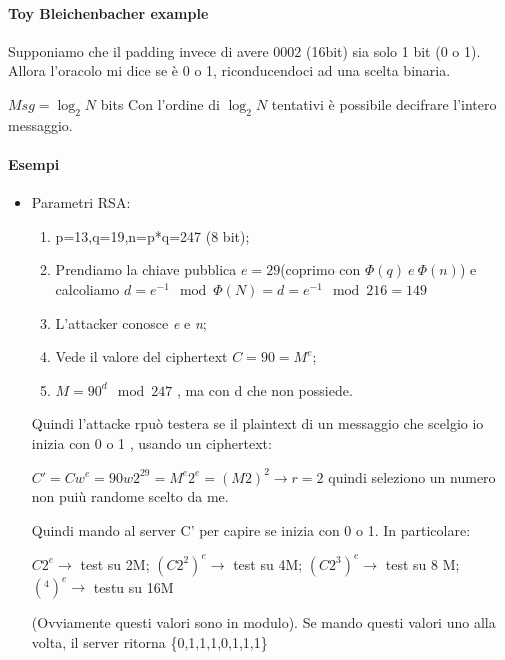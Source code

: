 \documentclass{book}
\theoremstyle{remark}
\begin{document}
\paragraph{Toy Bleichenbacher example}
Supponiamo che il padding invece di avere 0002 (16bit) sia solo 1 bit (0 o 1)\@. Allora l'oracolo mi dice se è 0 o 1, riconducendoci ad una scelta binaria\@.\newline
\begin{center}
	\(Msg=\log_{2}{N}\) bits\newline
	Con l'ordine di \(\log_{2}{N}\) tentativi è possibile decifrare l'intero messaggio\@.
\end{center}
\paragraph{Esempi}
\begin{itemize}
	\item Parametri RSA:\begin{enumerate}
		\item p=13,q=19,n=p*q=247 (8 bit);\@
		\item Prendiamo la chiave pubblica \(e=29\)(coprimo con \(\Phi(q)\ e\ \Phi(n) \)) e calcoliamo \(d=e^{-1}\mod{\Phi(N)}=d=e^{-1}\mod{216}=149\)
		\item L'attacker conosce \emph{e} e \emph{n};\@
		\item Vede il valore del ciphertext \(C=90=M^e\);\@
		\item \(M=90^d \mod{247}\) , ma con d che non possiede\@.
	\end{enumerate}
	Quindi l'attacke rpuò testera se il plaintext di un messaggio che scelgio io inizia con 0 o 1 , usando un ciphertext:\begin{center}
		\(C'=Cw^e=90w2^{29}=M^e2^e=(M2)^2\rightarrow r=2\) quindi seleziono un numero non puiù randome scelto da me\@.
	\end{center}
	Quindi mando al server C' per capire se inizia con 0 o 1\@. In particolare:\begin{center}
		\(C2^{e}\rightarrow\) test su 2M;\@\newline
		\((C2^2)^{e}\rightarrow \) test su 4M;\@\newline
		\((C2^3)^{e}\rightarrow \) test su 8 M;\@
		\((^4)^{e}\rightarrow \)	testu su 16M
	\end{center}
	(Ovviamente questi valori sono in modulo)\@.\newline
	Se mando questi valori uno alla volta, il server ritorna \{0,1,1,1,0,1,1,1\}
\end{itemize}
\end{document}
